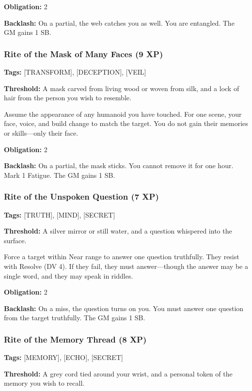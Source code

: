 \textbf{Obligation:} 2

\textbf{Backlash:} On a partial, the web catches you as well. You are entangled. The GM gains 1 SB.

\subsubsection{Rite of the Mask of Many Faces (9 XP)}

\textbf{Tags:} [TRANSFORM], [DECEPTION], [VEIL]

\textbf{Threshold:} A mask carved from living wood or woven from silk, and a lock of hair from the person you wish to resemble.

Assume the appearance of any humanoid you have touched. For one scene, your face, voice, and build change to match the target. You do not gain their memories or skills—only their face.

\textbf{Obligation:} 2

\textbf{Backlash:} On a partial, the mask sticks. You cannot remove it for one hour. Mark 1 Fatigue. The GM gains 1 SB.

\subsubsection{Rite of the Unspoken Question (7 XP)}

\textbf{Tags:} [TRUTH], [MIND], [SECRET]

\textbf{Threshold:} A silver mirror or still water, and a question whispered into the surface.

Force a target within Near range to answer one question truthfully. They resist with Resolve (DV 4). If they fail, they must answer—though the answer may be a single word, and they may speak in riddles.

\textbf{Obligation:} 2

\textbf{Backlash:} On a miss, the question turns on you. You must answer one question from the target truthfully. The GM gains 1 SB.

\subsubsection{Rite of the Memory Thread (8 XP)}

\textbf{Tags:} [MEMORY], [ECHO], [SECRET]

\textbf{Threshold:} A grey cord tied around your wrist, and a personal token of the memory you wish to recall.

